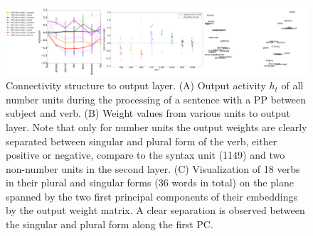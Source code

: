 \begin{figure}[t]
\centering
\includegraphics[width=\textwidth]{Figures/Figure4_output_weights.png}
\caption{Connectivity structure to output layer. (A) Output activity $h_t$ of all number units during the processing of a sentence with a PP between subject and verb. (B) Weight values from various units to output layer. Note that only for number units the output weights are clearly separated between singular and plural form of the verb, either positive or negative, compare to the syntax unit (1149) and two non-number units in the second layer. (C) Visualization of 18 verbs in their plural and singular forms (36 words in total) on the plane spanned by the two first principal components of their embeddings by the output weight matrix. A clear separation is observed between the singular and plural form along the first PC.}
\end{figure}


